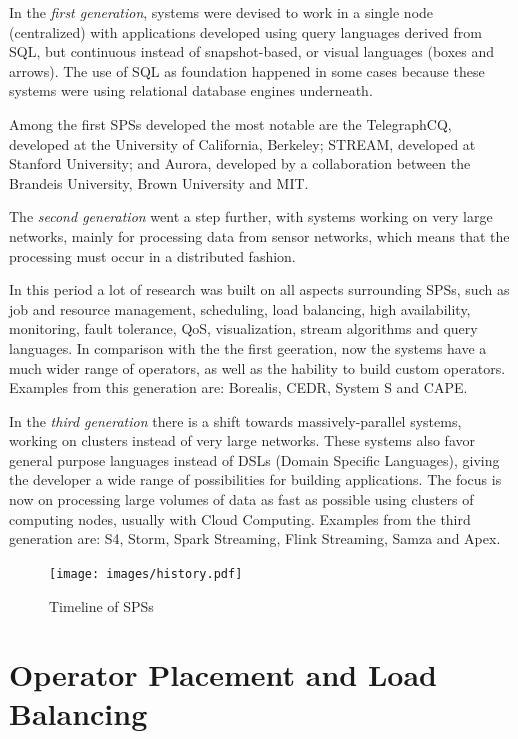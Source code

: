 \documentclass[ppgc,diss,english]{iiufrgs}
\begin{document}
In the \emph{first generation}, systems were devised to work in a single node (centralized) with applications developed using query languages derived from SQL, but continuous instead of snapshot-based, or visual languages (boxes and arrows). The use of SQL as foundation happened in some cases because these systems were using relational database engines underneath.

Among the first SPSs developed the most notable are the TelegraphCQ, developed at the University of California, Berkeley; STREAM, developed at Stanford University; and Aurora, developed by a collaboration between the Brandeis University, Brown University and MIT.

The \emph{second generation} went a step further, with systems working on very large networks, mainly for processing data from sensor networks, which means that the processing must occur in a distributed fashion.

In this period a lot of research was built on all aspects surrounding SPSs, such as job and resource management, scheduling, load balancing, high availability, monitoring, fault tolerance, QoS, visualization, stream algorithms and query languages. In comparison with the the first geeration, now the systems have a much wider range of operators, as well as the hability to build custom operators. Examples from this generation are: Borealis, CEDR, System S and CAPE.

In the \emph{third generation} there is a shift towards massively-parallel systems, working on clusters instead of very large networks. These systems also favor general purpose languages instead of DSLs (Domain Specific Languages), giving the developer a wide range of possibilities for building applications. The focus is now on processing large volumes of data as fast as possible using clusters of computing nodes, usually with Cloud Computing. Examples from the third generation are: S4, Storm, Spark Streaming, Flink Streaming, Samza and Apex.

\begin{figure}[!ht]
	\centering
	\texttt{[image: images/history.pdf]}
	\caption[Timeline of SPSs]{Timeline of SPSs \cite{heinze2014cloud}\cite{paulvincent2014}}
	\label{fig:sps_history}
\end{figure}


\section{Operator Placement and Load Balancing}
\label{sec:esp:scheduling_load_balancing}
\end{document}
